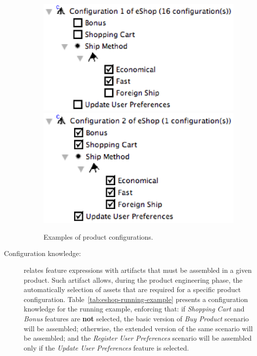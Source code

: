 \documentclass{acm_proc_article-sp}
\begin{document}
\begin{description}
\begin{figure}[h]
  \centerline{
    \mbox{\includegraphics[scale=0.5]{img/pc-01.eps}}
    \mbox{\includegraphics[scale=0.5]{img/pc-02.eps}}
  }
  \caption{Examples of product configurations.}
  \label{fig:product-config-01-02}
  \end{figure}

\item[Configuration knowledge:] relates feature expressions with artifacts that must be assembled in a given product. Such artifact allows, during the product engineering phase, the automatically selection of assets that are 
required for a specific product configuration. Table~\ref{tab:eshop-running-example} presents a configuration knowledge 
for the running example, enforcing that: if \emph{Shopping Cart} and \emph{Bonus} features are {\bf not} selected, the 
basic version of \emph{Buy Product} scenario will be assembled; otherwise, the extended version of the same 
scenario will be assembled; and the \emph{Register User Preferences} scenario will be assembled only if the \emph{Update 
User Preferences} feature is selected.


\end{description}
\end{document}
